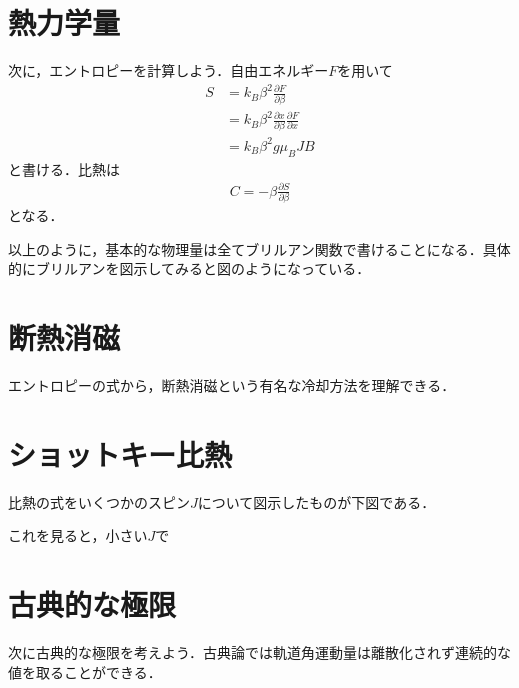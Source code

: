\documentclass[a4j]{jarticle}
\begin{document}
\section{熱力学量}
次に，エントロピーを計算しよう．自由エネルギー$F$を用いて
\begin{align*}
 S&=k_B\beta^2\frac{\partial F}{\partial \beta} \\
  &=k_B\beta^2\frac{\partial x}{\partial \beta}\frac{\partial F}{\partial x} \\
  &=k_B\beta^2 g\mu_BJB
\end{align*}
と書ける．比熱は
\begin{align*}
 C=-\beta \frac{\partial S}{\partial \beta }
\end{align*}
となる．

以上のように，基本的な物理量は全てブリルアン関数で書けることになる．具体的にブリルアンを図示してみると図のようになっている．


\section{断熱消磁}
エントロピーの式から，断熱消磁という有名な冷却方法を理解できる．


\section{ショットキー比熱}
比熱の式をいくつかのスピン$J$について図示したものが下図である．

これを見ると，小さい$J$で


\section{古典的な極限}
次に古典的な極限を考えよう．古典論では軌道角運動量は離散化されず連続的な値を取ることができる．
\end{document}
